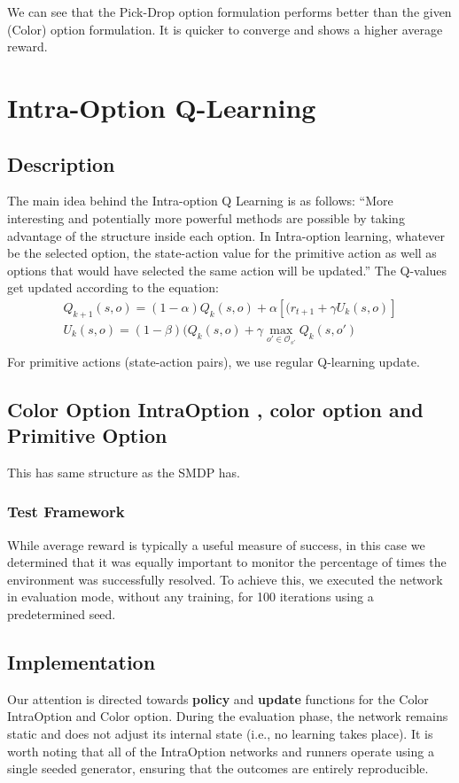 \documentclass[A4]{article}
\begin{document}
    We can see that the Pick-Drop option formulation performs better than the given (Color) option formulation.
    It is quicker to converge and shows a higher average reward.


    \section{Intra-Option Q-Learning}

    \subsection{Description}
    The main idea behind the Intra-option Q Learning is as follows: ``More interesting and potentially
    more powerful methods are possible by taking advantage of the structure inside each option.
    In Intra-option learning, whatever be the selected option, the state-action value
    for the primitive action as well as options that would have selected the same
    action will be updated.''
    The Q-values get updated according to the equation:
    \begin{gather*}
        Q_{k+1}(s,o) = (1-\alpha)Q_k(s,o)+\alpha[(r_{t+1} + \gamma U_k(s,o)]\\
        U_k(s,o) = (1-\beta)(Q_k(s,o)+ \gamma \max_{o' \in \mathcal{O}_{s'}}{Q_k(s,o') }\\
    \end{gather*}
    For primitive actions (state-action pairs), we use regular Q-learning update.

    \subsection{Color Option IntraOption , color option and Primitive Option}
    This has same structure as the SMDP has.

    \subsubsection{Test Framework}
    While average reward is typically a useful measure of success, in this case we determined that it was equally important to monitor the percentage of times the environment was successfully resolved. To achieve this, we executed the network in evaluation mode, without any training, for 100 iterations using a predetermined seed.

    \subsection{Implementation}
    Our attention is directed towards \textbf{policy} and \textbf{update} functions for the Color IntraOption and Color option.
    During the evaluation phase, the network remains static and does not adjust its internal state (i.e., no learning takes place). It is worth noting that all of the IntraOption networks and runners operate using a single seeded generator, ensuring that the outcomes are entirely reproducible.
\end{document}
